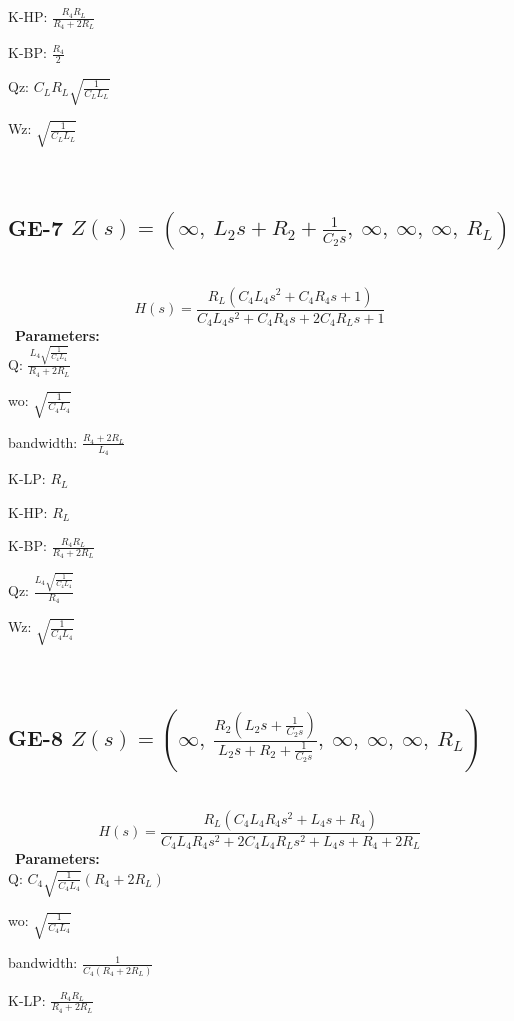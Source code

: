 \documentclass{article}
\begin{document}
K-HP: $\frac{R_{4} R_{L}}{R_{4} + 2 R_{L}}$\ 

K-BP: $\frac{R_{4}}{2}$\ 

Qz: $C_{L} R_{L} \sqrt{\frac{1}{C_{L} L_{L}}}$\ 

Wz: $\sqrt{\frac{1}{C_{L} L_{L}}}$\ 

\ 

\subsection{GE-7 $Z(s) = \left( \infty, \  L_{2} s + R_{2} + \frac{1}{C_{2} s}, \  \infty, \  \infty, \  \infty, \  R_{L}\right)$ } \ 
\textbf{\[H(s) = \frac{R_{L} \left(C_{4} L_{4} s^{2} + C_{4} R_{4} s + 1\right)}{C_{4} L_{4} s^{2} + C_{4} R_{4} s + 2 C_{4} R_{L} s + 1}\] } \ 
\textbf{Parameters:}\\ 

Q: $\frac{L_{4} \sqrt{\frac{1}{C_{4} L_{4}}}}{R_{4} + 2 R_{L}}$\ 

wo: $\sqrt{\frac{1}{C_{4} L_{4}}}$\ 

bandwidth: $\frac{R_{4} + 2 R_{L}}{L_{4}}$\ 

K-LP: $R_{L}$\ 

K-HP: $R_{L}$\ 

K-BP: $\frac{R_{4} R_{L}}{R_{4} + 2 R_{L}}$\ 

Qz: $\frac{L_{4} \sqrt{\frac{1}{C_{4} L_{4}}}}{R_{4}}$\ 

Wz: $\sqrt{\frac{1}{C_{4} L_{4}}}$\ 

\ 

\subsection{GE-8 $Z(s) = \left( \infty, \  \frac{R_{2} \left(L_{2} s + \frac{1}{C_{2} s}\right)}{L_{2} s + R_{2} + \frac{1}{C_{2} s}}, \  \infty, \  \infty, \  \infty, \  R_{L}\right)$ } \ 
\textbf{\[H(s) = \frac{R_{L} \left(C_{4} L_{4} R_{4} s^{2} + L_{4} s + R_{4}\right)}{C_{4} L_{4} R_{4} s^{2} + 2 C_{4} L_{4} R_{L} s^{2} + L_{4} s + R_{4} + 2 R_{L}}\] } \ 
\textbf{Parameters:}\\ 

Q: $C_{4} \sqrt{\frac{1}{C_{4} L_{4}}} \left(R_{4} + 2 R_{L}\right)$\ 

wo: $\sqrt{\frac{1}{C_{4} L_{4}}}$\ 

bandwidth: $\frac{1}{C_{4} \left(R_{4} + 2 R_{L}\right)}$\ 

K-LP: $\frac{R_{4} R_{L}}{R_{4} + 2 R_{L}}$\ 
\end{document}

